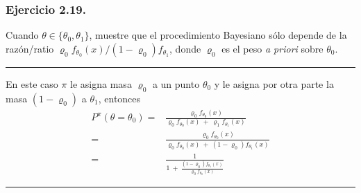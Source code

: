\documentclass[12pt,]{article}
\begin{document}
\subsubsection{Ejercicio 2.19.}\label{ejercicio-2.19.}

Cuando \(\theta\in\{\theta_0,\theta_1\}\), muestre que el procedimiento
Bayesiano sólo depende de la razón/ratio
\(\varrho_0f_{\theta_0}(x)/(1-\varrho_0)f_{\theta_1}\), donde
\(\varrho_0\) es el peso \emph{a priori} sobre \(\theta_0\).

\begin{center}\rule{0.5\linewidth}{\linethickness}\end{center}

En este caso \(\pi\) le asigna masa \(\varrho_0\) a un punto
\(\theta_0\) y le asigna por otra parte la masa \((1-\varrho_0)\) a
\(\theta_1\), entonces \[
\begin{array}{rl}
P^\pi(\theta=\theta_0)=&\displaystyle \frac{\varrho_0 f_{\theta_0}(x)}{\varrho_0 f_{\theta_0}(x)\ +\ \varrho_1 f_{\theta_1}(x)}\\
=&\displaystyle \frac{\varrho_0 f_{\theta_0}(x)}{\varrho_0 f_{\theta_0}(x)\ +\ (1-\varrho_0) f_{\theta_1}(x)}\\
=&\displaystyle \frac{1}{1\ +\ \displaystyle \frac{(1-\varrho_0) f_{\theta_1}(x)}{\varrho_0 f_{\theta_0}(x)}}
\end{array}
\]

\begin{center}\rule{0.5\linewidth}{\linethickness}\end{center}
\end{document}
